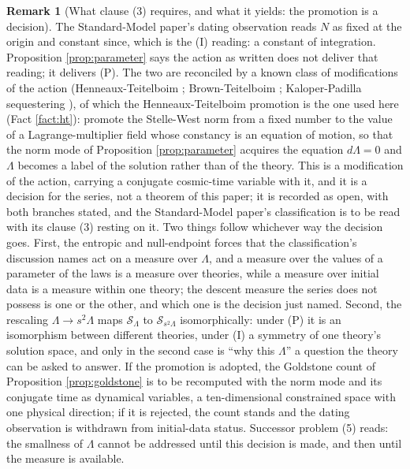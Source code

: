 \documentclass[11pt]{article}
\theoremstyle{definition}
\newtheorem{remark}[theorem]{Remark}
\begin{document}
\begin{remark}[What clause (3) requires, and what it yields: the promotion is a decision]\label{rem:promotion}
The Standard-Model paper's dating observation reads $N$ as fixed at the origin and constant since, which is the (I) reading: a constant of integration. Proposition \ref{prop:parameter} says the action as written does not deliver that reading; it delivers (P). The two are reconciled by a known class of modifications of the action (Henneaux-Teitelboim \cite{HenneauxTeitelboim1989}; Brown-Teitelboim \cite{BrownTeitelboim1988}; Kaloper-Padilla sequestering \cite{KaloperPadilla2014}), of which the Henneaux-Teitelboim promotion is the one used here (Fact \ref{fact:ht}): promote the Stelle-West norm from a fixed number to the value of a Lagrange-multiplier field whose constancy is an equation of motion, so that the norm mode of Proposition \ref{prop:parameter} acquires the equation $d\Lambda = 0$ and $\Lambda$ becomes a label of the solution rather than of the theory. This is a modification of the action, carrying a conjugate cosmic-time variable with it, and it is a decision for the series, not a theorem of this paper; it is recorded as open, with both branches stated, and the Standard-Model paper's classification is to be read with its clause (3) resting on it. Two things follow whichever way the decision goes. First, the entropic and null-endpoint forces that the classification's discussion names act on a measure over $\Lambda$, and a measure over the values of a parameter of the laws is a measure over theories, while a measure over initial data is a measure within one theory; the descent measure the series does not possess is one or the other, and which one is the decision just named. Second, the rescaling $\Lambda \to s^2\Lambda$ maps $\mathcal{S}_\Lambda$ to $\mathcal{S}_{s^2\Lambda}$ isomorphically: under (P) it is an isomorphism between different theories, under (I) a symmetry of one theory's solution space, and only in the second case is ``why this $\Lambda$'' a question the theory can be asked to answer. If the promotion is adopted, the Goldstone count of Proposition \ref{prop:goldstone} is to be recomputed with the norm mode and its conjugate time as dynamical variables, a ten-dimensional constrained space with one physical direction; if it is rejected, the count stands and the dating observation is withdrawn from initial-data status. Successor problem (5) reads: the smallness of $\Lambda$ cannot be addressed until this decision is made, and then until the measure is available.
\end{remark}
\end{document}
